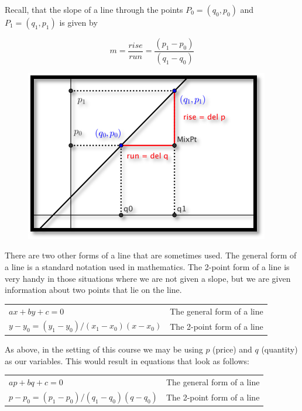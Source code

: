 \documentclass[10pt,]{book}
\theoremstyle{plain}
\theoremstyle{definition}
\newenvironment{assemblage-untitled}{\mdfsetup{%
roundcorner=2ex, backgroundcolor=blue!5,linecolor=blue!75!black,}%
\begin{mdframed}}{\end{mdframed}}
\theoremstyle{definition}
\begin{document}
Recall, that the slope of a line through the points \(P_0=(q_0,p_0)\) and \(P_1=(q_1,p_1)\) is given by%
\begin{assemblage-untitled}\label{SlopeDef}
\begin{equation*}m=\frac{rise}{run}=\frac{(p_1-p_0)}{(q_1-q_0 )}\end{equation*}%
\end{assemblage-untitled}
\leavevmode%
\begin{figure}
\centering
\includegraphics[width=0.5\linewidth]{images/sec1-1-slope.png}
\end{figure}
\par
There are two other forms of a line that are sometimes used. The general form of a line is a standard notation used in mathematics. The 2-point form of a line is very handy in those situations where we are not given a slope, but we are given information about two points that lie on the line.%
\begin{assemblage-untitled}\label{GeneralLinearEquations}
\leavevmode%
\begin{table}
\centering
\begin{tabular}{ll}
\(a x+b y+c=0\)& The general form of a line\tabularnewline[0pt]
\(y-y_0=(y_1-y_0)/(x_1-x_0 )(x-x_0)\) &The 2-point form of a line
\end{tabular}
\end{table}
\end{assemblage-untitled}
\par
As above, in the setting of this course we may be using \(p\) (price) and \(q\) (quantity) as our variables. This would result in equations that look as follows:%
\begin{assemblage-untitled}\label{PQGeneralLinearEquations}
\leavevmode%
\begin{table}
\centering
\begin{tabular}{ll}
\(a p+b q+c=0\)& The general form of a line\tabularnewline[0pt]
\(p-p_0=(p_1-p_0)/(q_1-q_0 )(q-q_0)\) &The 2-point form of a line
\end{tabular}
\end{table}
\end{assemblage-untitled}
\end{document}
